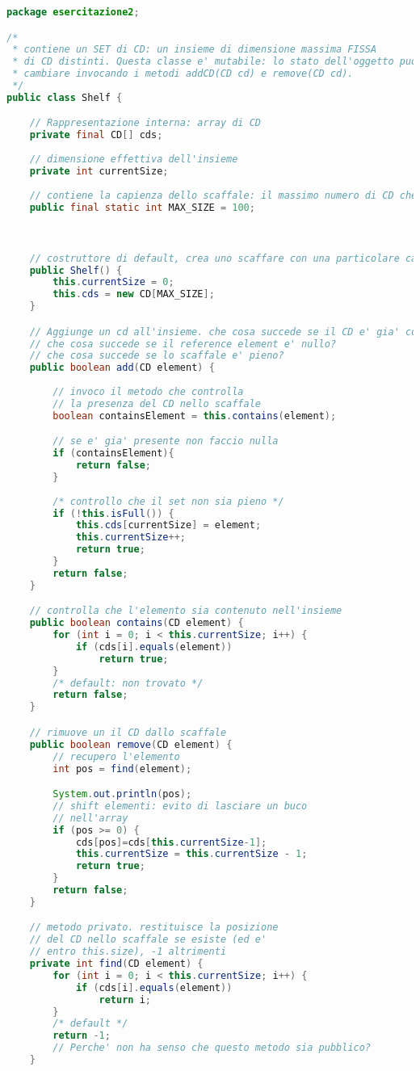 \documentclass{article}
\begin{document}
\begin{lstlisting}[language=Java,escapechar=|]
package esercitazione2;

/*
 * contiene un SET di CD: un insieme di dimensione massima FISSA
 * di CD distinti. Questa classe e' mutabile: lo stato dell'oggetto puo'
 * cambiare invocando i metodi addCD(CD cd) e remove(CD cd).
 */
public class Shelf {

	// Rappresentazione interna: array di CD
	private final CD[] cds;
	
	// dimensione effettiva dell'insieme
	private int currentSize;
	
	// contiene la capienza dello scaffale: il massimo numero di CD che e' possibile contenere
	public final static int MAX_SIZE = 100;

	

	// costruttore di default, crea uno scaffare con una particolare capienza
	public Shelf() {
		this.currentSize = 0;
		this.cds = new CD[MAX_SIZE];
	}

	// Aggiunge un cd all'insieme. che cosa succede se il CD e' gia' contenuto nell'insieme?
	// che cosa succede se il reference element e' nullo?
	// che cosa succede se lo scaffale e' pieno?
	public boolean add(CD element) {
		
		// invoco il metodo che controlla
		// la presenza del CD nello scaffale
		boolean containsElement = this.contains(element);

		// se e' gia' presente non faccio nulla
		if (containsElement){
			return false;
		}
			
		/* controllo che il set non sia pieno */
		if (!this.isFull()) {
			this.cds[currentSize] = element;
			this.currentSize++;
			return true;
		}
		return false;
	}

	// controlla che l'elemento sia contenuto nell'insieme
	public boolean contains(CD element) {
		for (int i = 0; i < this.currentSize; i++) {
			if (cds[i].equals(element))
				return true;
		}
		/* default: non trovato */
		return false;
	}

	// rimuove un il CD dallo scaffale
	public boolean remove(CD element) {
		// recupero l'elemento
		int pos = find(element);

		System.out.println(pos);
		// shift elementi: evito di lasciare un buco
		// nell'array
		if (pos >= 0) {
			cds[pos]=cds[this.currentSize-1];
			this.currentSize = this.currentSize - 1;
			return true;
		}
		return false;
	}

	// metodo privato. restituisce la posizione
	// del CD nello scaffale se esiste (ed e'
	// entro this.size), -1 altrimenti
	private int find(CD element) {
		for (int i = 0; i < this.currentSize; i++) {
			if (cds[i].equals(element))
				return i;
		}
		/* default */
		return -1;
		// Perche' non ha senso che questo metodo sia pubblico?
	}


\end{lstlisting}
\end{document}
